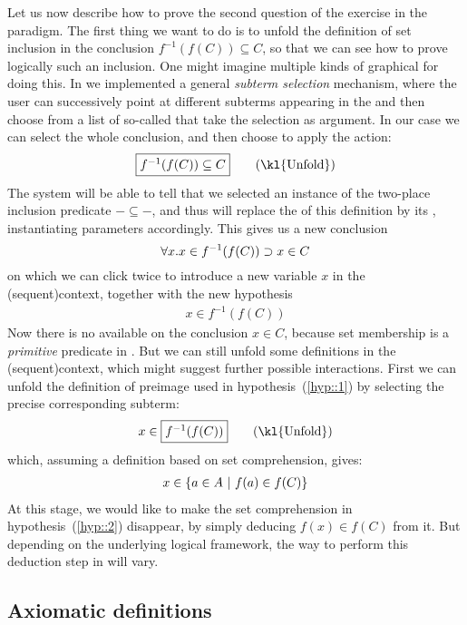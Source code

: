 \AP
Let us now describe how to prove the second question of the exercise in the
 paradigm. The first thing we want to do is to unfold the definition of
set inclusion in the conclusion $f^{-1}(f(C)) \subseteq C$, so that we can see
how to prove logically such an inclusion. One might imagine multiple kinds of
graphical  for doing this. In  we implemented a general
\emph{subterm selection} mechanism, where the user can successively point at
different subterms appearing in the  and then choose from a list of
so-called  that take the selection as argument. In our
case we can select the whole conclusion, and then choose to apply the
 action:
$$\select{f^{-1}(f(C)) \subseteq C} \qquad \text{(\kl{Unfold})}$$
The system will be able to tell that we selected an instance of the two-place
inclusion predicate $- \subseteq -$, and thus will replace the 
of this definition by its , instantiating parameters accordingly. This
gives us a new conclusion
$$\forall x. x \in f^{-1}(f(C)) \supset x \in C$$
on which we can click twice to introduce a new variable $x$ in the \kl(sequent){context},
together with the new hypothesis
\begin{gather}
  x \in f^{-1}(f(C)) \label{hyp::1}
\end{gather}
Now there is no available  on the conclusion $x \in C$, because set
membership is a \emph{primitive} predicate in . But we can still
unfold some definitions in the \kl(sequent){context}, which might suggest
further possible interactions. First we can unfold the definition of preimage
used in hypothesis~(\ref{hyp::1}) by selecting the precise corresponding
subterm:
$$x \in \select{f^{-1}(f(C))} \qquad \text{(\kl{Unfold})}$$
which, assuming a definition based on set comprehension, gives:
\begin{gather}
  x \in \left\{a \in A ~\middle|~ f(a) \in f(C)\right\} \label{hyp::2}
\end{gather}
At this stage, we would like to make the set comprehension in
hypothesis~(\ref{hyp::2}) disappear, by simply deducing $f(x) \in f(C)$ from it.
But depending on the underlying logical framework, the way to perform this
deduction step in  will vary.

\subsection{Axiomatic definitions}

